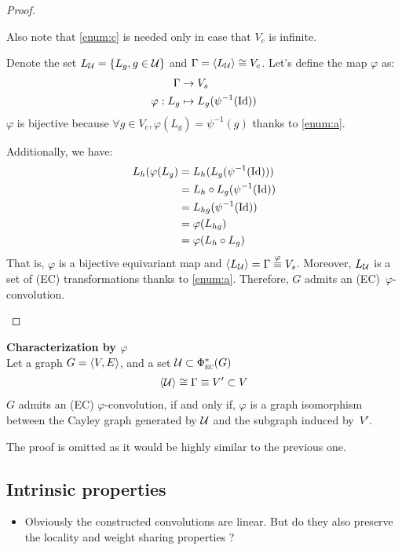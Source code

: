 \begin{proof}
\begin{enumerate}
Also note that \ref{enum:c} is needed only in case that $V_c$ is infinite.

Denote the set $L_{\mathcal{U}} = \{L_g, g \in \mathcal{U} \}$ and $\Gamma = \langle L_{\mathcal{U}} \rangle \cong V_c$. Let's define the map $\varphi$ as:
\begin{align*}
\Gamma & \rightarrow V_s\\
\varphi: L_g & \mapsto L_g(\psi^{-1}(\operatorname{Id}))
\end{align*}
$\varphi$ is bijective because $\forall g \in V_c, \varphi(L_g) = \psi^{-1}(g)$ thanks to \ref{enum:a}.

Additionally, we have:
\begin{align*}
L_h(\varphi(L_g) & = L_h(L_g(\psi^{-1}(\operatorname{Id})))\\
 & = L_h \circ L_g(\psi^{-1}(\operatorname{Id}))\\
 & = L_{hg}(\psi^{-1}(\operatorname{Id}))\\
 & = \varphi(L_{hg})\\
 & = \varphi(L_h \circ L_g)
\end{align*}
That is, $\varphi$ is a bijective equivariant map and $ \langle L_{\mathcal{U}} \rangle = \Gamma \overset{\varphi}{\equiv} V_s$. Moreover, $L_{\mathcal{U}}$ is a set of (EC) transformations thanks to \ref{enum:a}. Therefore, $G$ admits an (EC)~$\varphi$-convolution.
\end{enumerate}
\end{proof}

\begin{corrolary}\textbf{Characterization by $\varphi$}\\
Let a graph $G = \langle V, E \rangle$, and a set $\mathcal{U} \subset \Phi^*_{\operatorname{\textsc{ec}}}(G)$ \st
\begin{gather*}
\langle \mathcal{U} \rangle \cong \Gamma \equiv V' \subset V
\end{gather*}
$G$ admits an (EC) $\varphi$-convolution, if and only if, $\varphi$ is a graph isomorphism between the Cayley graph generated by $\mathcal{U}$ and the subgraph induced by~$V'$.
\label{cor:cayley}
\end{corrolary}
The proof is omitted as it would be highly similar to the previous one.

\subsection{Intrinsic properties}

\begin{itemize}
  \item Obviously the constructed convolutions are linear. But do they also preserve the locality and weight sharing properties ?
\end{itemize}

